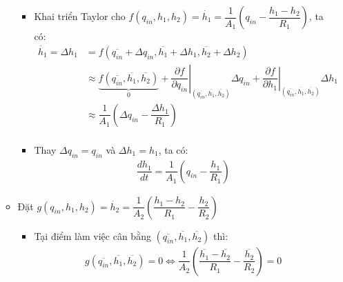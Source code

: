 \begin{enumerate}[\it a.]
\begin{itemize}
\begin{itemize}
                        \item Khai triển Taylor cho $f\left({q_{in}, h_1, h_2}\right) = \dot{h_1} = \dfrac{1}{A_1} \left({q_{in} - \dfrac{h_1 - h_2}{R_1}}\right)$, ta có:
                            \begin{align}
                                \dot{h_1} = \Delta h_1 & = f\left({\overline{q_{in}} + \Delta q_{in}, \overline{h_1} + \Delta h_1, \overline{h_2} + \Delta h_2}\right) \\
                                & \approx \underbrace{f\left({\overline{q_{in}}, \overline{h_1}, \overline{h_2}}\right)}_{0} + \left.\dfrac{\partial f}{\partial q_{in}}\right|_{\left({\overline{q_{in}}, \overline{h_1}, \overline{h_2}}\right)} \Delta q_{in} + \left.\dfrac{\partial f}{\partial h_1}\right|_{\left({\overline{q_{in}}, \overline{h_1}, \overline{h_2}}\right)} \Delta h_1\\
                                & \approx \dfrac{1}{A_1} \left({\Delta q_{in} - \dfrac{\Delta h_1}{R_1}}\right)\\
                            \end{align}

                        \item Thay $\Delta q_{in} = q_{in}$ và $\Delta h_1 = h_1$, ta có:
                            \begin{align}
                                \dfrac{dh_1}{dt} = \dfrac{1}{A_1} \left({q_{in} - \dfrac{h_1}{R_1}}\right)
                            \end{align}
                    \end{itemize}

                \item Đặt $g\left({q_{in}, h_1, h_2}\right) = \dot{h_2} = \dfrac{1}{A_2} \left({\dfrac{h_1 - h_2}{R_1} - \dfrac{h_2}{R_2}}\right)$
                    \begin{itemize}
                        \item Tại điểm làm việc cân bằng $\left({\overline{q_{in}}, \overline{h_1}, \overline{h_2}}\right)$ thì:
                            \begin{align}
                                g\left({\overline{q_{in}}, \overline{h_1}, \overline{h_2}}\right) = 0 \Longleftrightarrow \dfrac{1}{A_2} \left({\dfrac{\overline{h_1} - \overline{h_2}}{R_1} - \dfrac{\overline{h_2}}{R_2}}\right) = 0
                            \end{align}


\end{itemize}
\end{itemize}
\end{enumerate}
